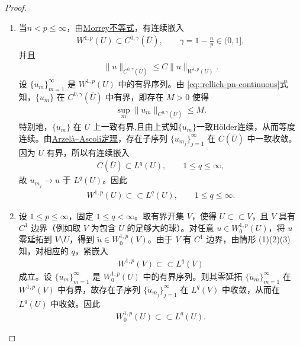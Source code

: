 \documentclass[../../main.tex]{subfiles}
\begin{document}
\begin{proof}
\begin{enumerate}[(1)]
\item 当$n< p\leqslant\infty$，由\hyperref[theorem:Morrey不等式]{Morrey不等式}，有连续嵌入
\begin{align}\label{eq::rellich-pn-continuous}
W^{1,p}(U)\subset C^{0,\gamma}(\overline{U}),\qquad
\gamma=1-\frac{n}{p}\in(0,1],
\end{align}
并且
\begin{align*}
\|u\|_{C^{0,\gamma}(\overline{U})}\leqslant C\|u\|_{W^{1,p}(U)}.
\end{align*}
设 $\{u_{m}\}_{m=1}^{\infty}$ 是 $W^{1,p}(U)$ 中的有界序列。由 \eqref{eq::rellich-pn-continuous}式知，$\{u_{m}\}$ 在 $C^{0,\gamma}(\overline{U})$ 中有界，即存在 $M>0$ 使得
\begin{align*}
\sup_{m}\|u_{m}\|_{C^{0,\gamma}(\overline{U})}\leqslant M.
\end{align*}
特别地，$\{u_{m}\}$ 在 $\overline{U}$ 上一致有界,且由上式知$\{u_{m}\}$一致H\"older连续，从而等度连续。由\hyperref[Functional Analysis-theorem:泛函分析--Arzelà-Ascoli定理]{Arzelà--Ascoli定理}，存在子序列 $\{u_{m_{j}}\}_{j=1}^{\infty}$ 在 $C(\overline{U})$ 中一致收敛。因为 $U$ 有界，所以有连续嵌入
\begin{align*}
C(\overline{U})\subset L^{q}(U),\qquad 1\leqslant q\leqslant\infty,
\end{align*}
故 $u_{m_{j}}\to u$ 于 $L^{q}(U)$。因此
\begin{align*}
W^{1,p}(U)\subset\subset L^{q}(U),\qquad 1\leqslant q\leqslant\infty.
\end{align*}

\item 设 $1\leqslant p\leqslant\infty$，固定 $1\leqslant q<\infty$。取有界开集 $V$，使得 $U\subset\subset V$，且 $V$ 具有 $C^{1}$ 边界（例如取 $V$ 为包含 $U$ 的足够大的球）。对任意 $u\in W_{0}^{1,p}(U)$，将 $u$ 零延拓到 $V\setminus U$，得到 $\widetilde{u}\in W_{0}^{1,p}(V)$。由于 $V$ 有 $C^{1}$ 边界，由情形 (1)(2)(3) 知，对相应的 $q$，紧嵌入
\begin{align*}
W^{1,p}(V)\subset\subset L^{q}(V)
\end{align*}
成立。设 $\{u_{m}\}_{m=1}^{\infty}$ 是 $W_{0}^{1,p}(U)$ 中的有界序列。则其零延拓 $\{\widetilde{u}_{m}\}_{m=1}^{\infty}$ 在 $W^{1,p}(V)$ 中有界，故存在子序列 $\{\widetilde{u}_{m_{j}}\}_{j=1}^{\infty}$ 在 $L^{q}(V)$ 中收敛，从而在 $L^{q}(U)$ 中收敛。因此
\begin{align*}
W_{0}^{1,p}(U)\subset\subset L^{q}(U).
\end{align*}
\end{enumerate}
\end{proof}
\end{document}

